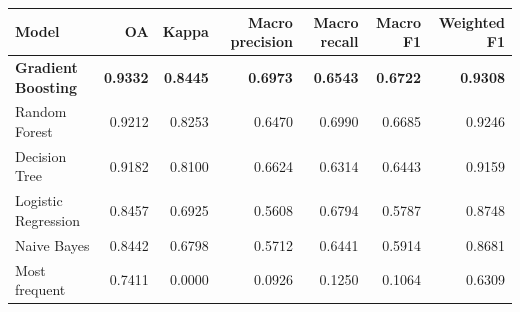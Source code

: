 \begin{tabular}{lrrrrrr}
\toprule
Model & OA & Kappa & Macro precision & Macro recall & Macro F1 & Weighted F1 \\
\midrule
\textbf{Gradient Boosting} & \textbf{0.9332} & \textbf{0.8445} & \textbf{0.6973} & \textbf{0.6543} & \textbf{0.6722} & \textbf{0.9308} \\
Random Forest & 0.9212 & 0.8253 & 0.6470 & 0.6990 & 0.6685 & 0.9246 \\
Decision Tree & 0.9182 & 0.8100 & 0.6624 & 0.6314 & 0.6443 & 0.9159 \\
Logistic Regression & 0.8457 & 0.6925 & 0.5608 & 0.6794 & 0.5787 & 0.8748 \\
Naive Bayes & 0.8442 & 0.6798 & 0.5712 & 0.6441 & 0.5914 & 0.8681 \\
Most frequent & 0.7411 & 0.0000 & 0.0926 & 0.1250 & 0.1064 & 0.6309 \\
\bottomrule
\end{tabular}
